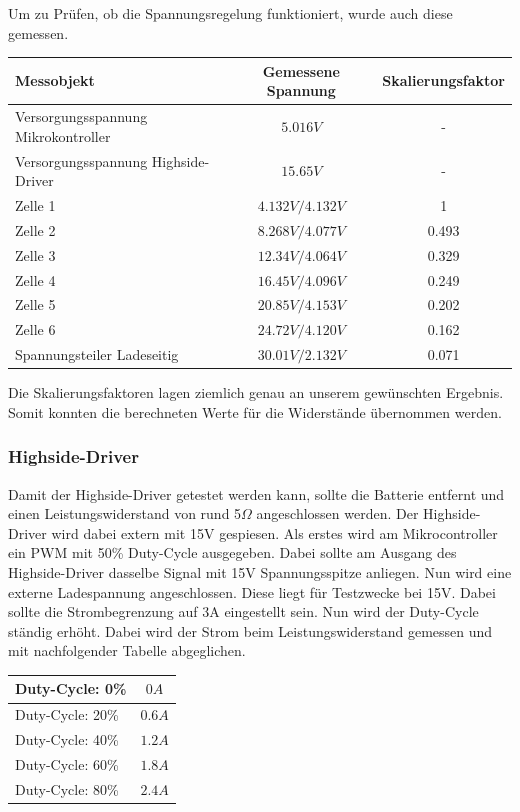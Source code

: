 Um zu Prüfen, ob die Spannungsregelung funktioniert, wurde auch diese gemessen.

\begin{center}
	\begin{tabular}{l|c|c}
		Messobjekt & Gemessene Spannung & Skalierungsfaktor \\ \hline
		Versorgungsspannung Mikrokontroller & $5.016V$ & - \\ \hline
		Versorgungsspannung Highside-Driver & $15.65V$ & - \\ \hline
		Zelle 1 & $4.132V / 4.132V$ & 1 \\ \hline
		Zelle 2 & $8.268V / 4.077V$ & 0.493 \\ \hline
		Zelle 3 & $12.34V / 4.064V$ & 0.329 \\ \hline
		Zelle 4 & $16.45V / 4.096V$ & 0.249 \\ \hline
		Zelle 5 & $20.85V / 4.153V$ & 0.202 \\ \hline
		Zelle 6 & $24.72V / 4.120V$ & 0.162 \\ \hline
		Spannungsteiler Ladeseitig & $30.01V / 2.132V$ & 0.071\\ \hline
	\end{tabular} 
	\label{tab:Spannungsmessungen}
\end{center}

Die Skalierungsfaktoren lagen ziemlich genau an unserem gewünschten Ergebnis. Somit konnten die berechneten Werte für die Widerstände übernommen werden.  

\subsubsection*{Highside-Driver}
\label{Highside-Driver}
Damit der Highside-Driver getestet werden kann, sollte die Batterie entfernt und einen Leistungswiderstand von rund 5$\Omega$ angeschlossen werden. Der Highside-Driver wird dabei extern mit 15V gespiesen. Als erstes wird am Mikrocontroller ein PWM mit 50\% Duty-Cycle ausgegeben. Dabei sollte am Ausgang des Highside-Driver dasselbe Signal mit 15V Spannungsspitze anliegen. Nun wird eine externe Ladespannung angeschlossen. Diese liegt für Testzwecke bei 15V. Dabei sollte die Strombegrenzung auf 3A eingestellt sein. Nun wird der Duty-Cycle ständig erhöht. Dabei wird der Strom beim Leistungswiderstand gemessen und mit nachfolgender Tabelle abgeglichen.

\begin{center}
	\begin{tabular}{l|c}
		\hline 
		Duty-Cycle: 0\% & $0A$ \\ \hline
		Duty-Cycle: 20\% & $0.6A$ \\ \hline
		Duty-Cycle: 40\% & $1.2A$ \\ \hline
		Duty-Cycle: 60\% & $1.8A$ \\ \hline
		Duty-Cycle: 80\% & $2.4A$ \\ \hline
	\end{tabular} 
	\label{tab:LadestromHighsideDriver}
\end{center}

